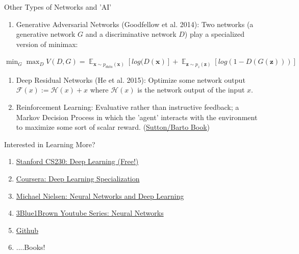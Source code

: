 \documentclass{beamer}
\DeclareMathOperator{\expected}{\mathbb{E}}%
\DeclareMathOperator*{\argmax}{max}
\DeclareMathOperator*{\argmin}{min}
\begin{document}
\begin{frame}{Other Types of Networks and 'AI'}
    \begin{enumerate}[1.]
        \item Generative Adversarial Networks (Goodfellow et al. 2014): Two networks (a generative network $G$ and a discriminative network $D$) play a specialized version of minimax:
    \end{enumerate}
    \centerline{$\displaystyle \argmin_G\argmax_DV(D,G)=\expected_{\textbf{x}\sim\textit{p}_{data}(\textbf{x})}[log(D(\textbf{x})]+\expected_{\textbf{z}\sim\textit{p}_{z}(\textbf{z})}[log(1-D(G(\textbf{z})))]$}
    \begin{enumerate}[2.]
        \item Deep Residual Networks (He et al. 2015): Optimize some network output $\mathcal{F}(x):=\mathcal{H}(x)+x$ where $\mathcal{H}(x)$ is the network output of the input $x$.
        \item Reinforcement Learning: Evaluative rather than instructive feedback; a Markov Decision Process in which the 'agent' interacts with the environment to maximize some sort of scalar reward. (\href{https://mitpress.mit.edu/books/reinforcement-learning-second-edition}{Sutton/Barto Book})
    \end{enumerate}
\end{frame}
\begin{frame}{Interested in Learning More?}
    \begin{enumerate}[1.]
        \item \textcolor{blue}{\href{https://cs230.stanford.edu/}{Stanford CS230: Deep Learning (Free!)}}
        \newline
        \item \textcolor{blue}{\href{https://www.coursera.org/specializations/deep-learning}{Coursera: Deep Learning Specialization}}
        \newline
        \item \textcolor{blue}{\href{http://neuralnetworksanddeeplearning.com/}{Michael Nielsen: Neural Networks and Deep Learning}}
        \newline
        \item \textcolor{blue}{\href{https://www.youtube.com/playlist?list=PLZHQObOWTQDNU6R1_67000Dx_ZCJB-3pi}{3Blue1Brown Youtube Series: Neural Networks}}
        \newline
        \item \textcolor{blue}{\href{https://github.com/lbmallory/NNPresentationCode}{Github}}
        \newline
        \item ....Books!
    \end{enumerate}
\end{frame}
\end{document}
